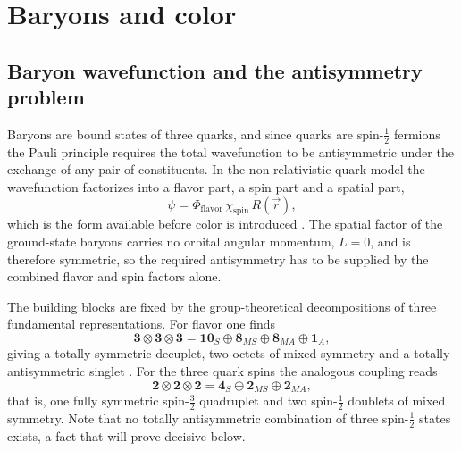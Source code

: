 \section{Baryons and color}
\label{sec:baryons-color}

\subsection{Baryon wavefunction and the antisymmetry problem}
\label{subsec:baryon-antisymmetry}

Baryons are bound states of three quarks, and since quarks are spin-$\tfrac{1}{2}$
fermions the Pauli principle requires the total wavefunction to be antisymmetric
under the exchange of any pair of constituents. In the non-relativistic quark model
the wavefunction factorizes into a flavor part, a spin part and a spatial part,
\begin{equation}
    \psi = \Phi_{\text{flavor}}\,\chi_{\text{spin}}\,R(\vec{r}),
    \label{eq:baryon-Psi-nocolor}
\end{equation}
which is the form available before color is introduced \cite[Ch.~13]{Amsler2018}.
The spatial factor of the ground-state baryons carries no orbital angular momentum,
$L = 0$, and is therefore symmetric, so the required antisymmetry has to be supplied
by the combined flavor and spin factors alone.

The building blocks are fixed by the group-theoretical decompositions of three
fundamental representations. For flavor one finds
\begin{equation}
    \mathbf{3} \otimes \mathbf{3} \otimes \mathbf{3}
    = \mathbf{10}_{S} \oplus \mathbf{8}_{MS} \oplus \mathbf{8}_{MA}
      \oplus \mathbf{1}_{A},
    \label{eq:flavor-3x3x3}
\end{equation}
giving a totally symmetric decuplet, two octets of mixed symmetry and a totally
antisymmetric singlet \cite[Ch.~13]{Amsler2018}. For the three quark spins the
analogous coupling reads
\begin{equation}
    \mathbf{2} \otimes \mathbf{2} \otimes \mathbf{2}
    = \mathbf{4}_{S} \oplus \mathbf{2}_{MS} \oplus \mathbf{2}_{MA},
    \label{eq:spin-2x2x2}
\end{equation}
that is, one fully symmetric spin-$\tfrac{3}{2}$ quadruplet and two spin-$\tfrac{1}{2}$
doublets of mixed symmetry. Note that no totally antisymmetric combination of three
spin-$\tfrac{1}{2}$ states exists, a fact that will prove decisive below.


